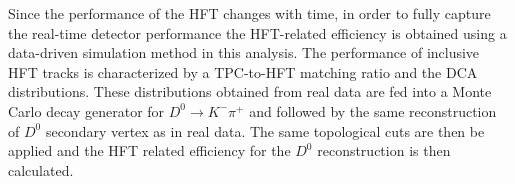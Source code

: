 \documentclass[%
 reprint,	
 amsmath,amssymb,
 aps,
 prc,
]{revtex4-1}
\begin{document}
Since the performance of the HFT changes with time, in order to fully capture the real-time detector performance the HFT-related efficiency is obtained using a data-driven simulation method in this analysis. The performance of inclusive HFT tracks is characterized by a TPC-to-HFT matching ratio and the DCA distributions. These distributions obtained from real data are fed into a Monte Carlo decay generator for $D^0\rightarrow K^-\pi^+$ and followed by the same reconstruction of $D^0$ secondary vertex as in real data. The same topological cuts are then be applied and the HFT related efficiency for the $D^0$ reconstruction is then calculated.



\end{document}
